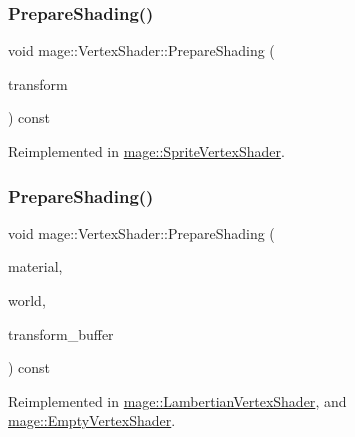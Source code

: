 \subsubsection{\texorpdfstring{Prepare\+Shading()}{PrepareShading()}\hspace{0.1cm}{\footnotesize\ttfamily [1/2]}}
{\footnotesize\ttfamily void mage\+::\+Vertex\+Shader\+::\+Prepare\+Shading (\begin{DoxyParamCaption}\item[{const X\+M\+M\+A\+T\+R\+IX \&}]{transform }\end{DoxyParamCaption}) const\hspace{0.3cm}{\ttfamily [virtual]}}



Reimplemented in \hyperlink{classmage_1_1_sprite_vertex_shader_a6daf06fe73ed40cc7b71e474070144fc}{mage\+::\+Sprite\+Vertex\+Shader}.

\hypertarget{classmage_1_1_vertex_shader_a15a8b2c1a1a4c8fde3ff903c999ec218}{}\label{classmage_1_1_vertex_shader_a15a8b2c1a1a4c8fde3ff903c999ec218} 
\subsubsection{\texorpdfstring{Prepare\+Shading()}{PrepareShading()}\hspace{0.1cm}{\footnotesize\ttfamily [2/2]}}
{\footnotesize\ttfamily void mage\+::\+Vertex\+Shader\+::\+Prepare\+Shading (\begin{DoxyParamCaption}\item[{const \hyperlink{structmage_1_1_material}{Material} \&}]{material,  }\item[{const \hyperlink{classmage_1_1_world}{World} \&}]{world,  }\item[{const Transform\+Buffer \&}]{transform\+\_\+buffer }\end{DoxyParamCaption}) const\hspace{0.3cm}{\ttfamily [virtual]}}



Reimplemented in \hyperlink{classmage_1_1_lambertian_vertex_shader_a62e3902fb931cddefd94e117e20d190b}{mage\+::\+Lambertian\+Vertex\+Shader}, and \hyperlink{classmage_1_1_empty_vertex_shader_a93db8bae83473934fb202aa499af586b}{mage\+::\+Empty\+Vertex\+Shader}.

\hypertarget{classmage_1_1_vertex_shader_a8b4115b041227ebe6a4ab8511eb5b8ea}{}\label{classmage_1_1_vertex_shader_a8b4115b041227ebe6a4ab8511eb5b8ea} 
